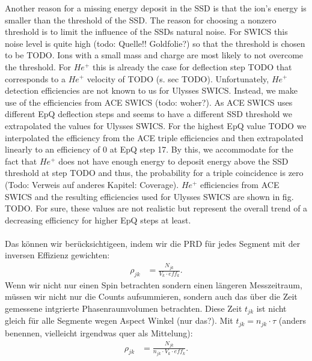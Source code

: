 Another reason for a missing energy deposit in the SSD is that the ion's energy is smaller than the threshold of the SSD. The reason for choosing a nonzero threshold is to limit the influence of the SSDs natural noise. For SWICS this noise level is quite high (todo: Quelle!! Goldfolie?) so that the threshold is chosen to be TODO. Ions with a small mass and charge are most likely to not overcome the threshold. For $He^{+}$ this is already the case for deflection step TODO that corresponds to a $He^{+}$ velocity of TODO (s. sec TODO).
Unfortunately, $He^{+}$ detection efficiencies are not known to us for Ulysses SWICS. Instead, we make use of the efficiencies from ACE SWICS (todo: woher?). As ACE SWICS uses different EpQ deflection steps and seems to have a different SSD threshold we extrapolated the values for Ulysses SWICS.
For the highest EpQ value TODO we interpolated the efficiency from the ACE triple efficiencies and then extrapolated linearly to an efficiency of 0 at EpQ step 17. By this, we accommodate for the fact that $He^{+}$ does not have enough energy to deposit energy above the SSD threshold at step TODO and thus, the probability for a triple coincidence is zero (Todo: Verweis auf anderes Kapitel: Coverage). $He^{+}$ efficiencies from ACE SWICS and the resulting efficiencies used for Ulysses SWICS are shown in fig. TODO. For sure, these values are not realistic but represent the overall trend of a decreasing efficiency for higher EpQ steps at least.
\\ \\
Das können wir berücksichtigeen, indem wir die PRD für jedes Segment mit der inversen Effizienz gewichten:
\begin{align*}
\rho_{jk} &= \frac{N_{jk}}{V_{k}\cdot eff_k}.
\end{align*}
Wenn wir nicht nur einen Spin betrachten sondern einen längeren Messzeitraum, müssen wir nicht nur die Counts aufsummieren, sondern auch das über die Zeit gemessene intgrierte Phasenraumvolumen betrachten. Diese Zeit $t_{jk}$ ist nicht gleich für alle Segmente wegen Aspect Winkel (nur das?). Mit $t_{jk} = n_{jk} \cdot \tau$ (anders benennen, vielleicht irgendwas quer als Mittelung):
\begin{align*}
\rho_{jk} &= \frac{N_{jk}}{n_{jk} \cdot V_{k}\cdot eff_k}.
\end{align*}


